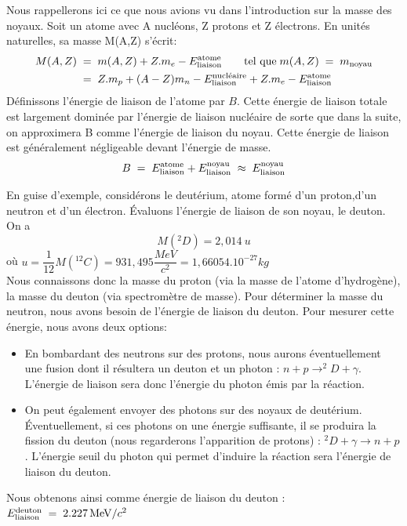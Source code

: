 Nous rappellerons ici ce que nous avions vu dans l'introduction sur la masse des noyaux. Soit un atome avec A nucléons, Z protons et Z électrons. En unités naturelles, sa masse M(A,Z) s'écrit:
\begin{align*}
    M(A,Z) 
    &\; = \;
    m(A,Z) + Z.m_e - E^{\text{atome}}_{\text{liaison}} \qquad \text{tel que} \; m(A,Z) \; = \; m_{\text{noyau}}\\
    &\; = \;
    Z.m_p + (A-Z)m_n - E^{\text{nucléaire}}_{\text{liaison}} + Z.m_e - E^{\text{atome}}_{\text{liaison}}
\end{align*}
Définissons l'énergie de liaison de l'atome par $B$. Cette énergie de liaison totale est largement dominée par l'énergie de liaison nucléaire de sorte que dans la suite, on approximera B comme l'énergie de liaison du noyau. Cette énergie de liaison est généralement négligeable devant l'énergie de masse.
\[
    B \; = \;
    E^{\text{atome}}_{\text{liaison}}+E^{\text{noyau}}_{\text{liaison}}
    \;\approx\; E^{\text{noyau}}_{\text{liaison}}
\]

En guise d'exemple, considérons le deutérium, atome formé d'un proton,d'un neutron et d'un électron. Évaluons l'énergie de liaison de son noyau, le deuton. On a 
    \[
        M(^{2}D)=2,014~u
    \] 
où $u=\dfrac{1}{12}M(^{12}_{}C)=931,495\dfrac{\si{MeV}}{c^2}=1,66054.10^{-27}kg$\\[0,2cm]
Nous connaissons donc la masse du proton (via la masse de l'atome d'hydrogène), la masse du deuton (via spectromètre de masse). Pour déterminer la masse du neutron, nous avons besoin de l'énergie de liaison du deuton. Pour mesurer cette énergie, nous avons deux options:
\begin{itemize}
    \item En bombardant des neutrons sur des protons, nous aurons éventuellement une fusion dont il résultera un deuton et un photon : $n+p \rightarrow ^2D+\gamma$. L'énergie de liaison sera donc l'énergie du photon émis par la réaction.
    
    \item On peut également envoyer des photons sur des noyaux de deutérium. Éventuellement, si ces photons on une énergie suffisante, il se produira la fission du deuton (nous regarderons l'apparition de protons) : $^2D+\gamma \rightarrow n+p$. L'énergie seuil du photon qui permet d'induire la réaction sera l'énergie de liaison du deuton.
\end{itemize}
Nous obtenons ainsi comme énergie de liaison du deuton : $E^{\text{deuton}}_{\text{liaison}} \; = \; \SI{2.227}{MeV}/c^2$


